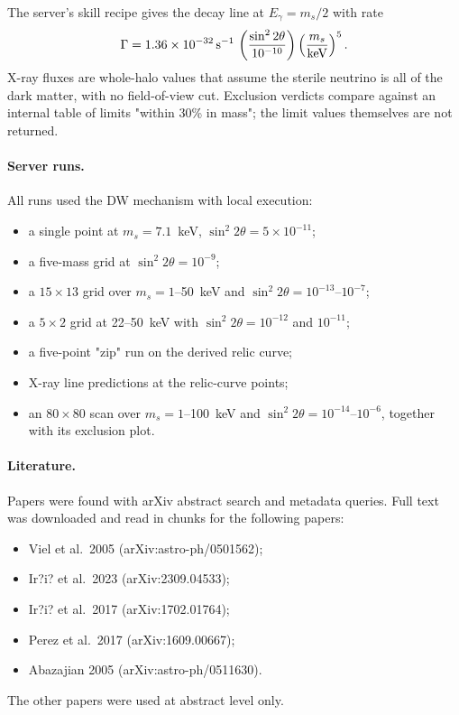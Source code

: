 \documentclass[11pt,a4paper]{article}
\begin{document}
The server's skill recipe gives the decay line at $E_\gamma=m_s/2$ with rate
\[
\Gamma = 1.36\times10^{-32}\,{\rm s^{-1}}\,\left(\frac{\sin^2 2\theta}{10^{-10}}\right)\left(\frac{m_s}{\rm keV}\right)^5 .
\]
X-ray fluxes are whole-halo values that assume the sterile neutrino is all of the dark matter, with no field-of-view cut. Exclusion verdicts compare against an internal table of limits "within 30\% in mass"; the limit values themselves are not returned.

\paragraph{Server runs.} All runs used the DW mechanism with local execution:
\begin{itemize}
\item a single point at $m_s=7.1$~keV, $\sin^2 2\theta=5\times10^{-11}$;
\item a five-mass grid at $\sin^2 2\theta=10^{-9}$;
\item a $15\times13$ grid over $m_s=1$--50~keV and $\sin^2 2\theta=10^{-13}$--$10^{-7}$;
\item a $5\times2$ grid at 22--50~keV with $\sin^2 2\theta = 10^{-12}$ and $10^{-11}$;
\item a five-point "zip" run on the derived relic curve;
\item X-ray line predictions at the relic-curve points;
\item an $80\times80$ scan over $m_s=1$--100~keV and $\sin^2 2\theta=10^{-14}$--$10^{-6}$, together with its exclusion plot.
\end{itemize}

\paragraph{Literature.} Papers were found with arXiv abstract search and metadata queries. Full text was downloaded and read in chunks for the following papers:
\begin{itemize}
\item Viel et al.\ 2005 (arXiv:astro-ph/0501562);
\item Ir?i? et al.\ 2023 (arXiv:2309.04533);
\item Ir?i? et al.\ 2017 (arXiv:1702.01764);
\item Perez et al.\ 2017 (arXiv:1609.00667);
\item Abazajian 2005 (arXiv:astro-ph/0511630).
\end{itemize}
The other papers were used at abstract level only.
\end{document}
